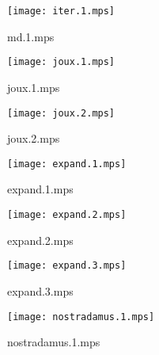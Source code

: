 \documentclass[letterpaper,10pt]{article}
\begin{document}
\begin{figure}
    \centering
    \texttt{[image: iter.1.mps]}
    \caption{md.1.mps}
\end{figure}

\begin{figure}
    \centering
    \texttt{[image: joux.1.mps]}
    \caption{joux.1.mps}
\end{figure}

\begin{figure}
    \centering
    \texttt{[image: joux.2.mps]}
    \caption{joux.2.mps}
\end{figure}

\begin{figure}
    \centering
    \texttt{[image: expand.1.mps]}
    \caption{expand.1.mps}
\end{figure}

\begin{figure}
    \centering
    \texttt{[image: expand.2.mps]}
    \caption{expand.2.mps}
\end{figure}

\begin{figure}
    \centering
    \texttt{[image: expand.3.mps]}
    \caption{expand.3.mps}
\end{figure}

\begin{figure}
    \centering
    \texttt{[image: nostradamus.1.mps]}
    \caption{nostradamus.1.mps}
\end{figure}
\end{document}
